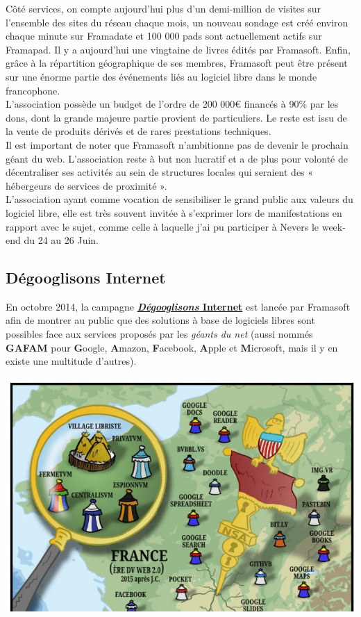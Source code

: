 \documentclass[10pt,a4paper, twoside]{report}
\begin{document}
	Côté services, on compte aujourd'hui plus d'un demi-million de visites sur l'ensemble des sites du réseau chaque mois, un nouveau sondage est créé environ chaque minute sur Framadate et 100 000 pads sont actuellement actifs sur Framapad. Il y a aujourd'hui une vingtaine de livres édités par Framasoft. Enfin, grâce à la répartition géographique de ses membres, Framasoft peut être présent sur une énorme partie des événements liés au logiciel libre dans le monde francophone.
	\\
	
	L'association possède un budget de l'ordre de 200 000\euro{} financés à 90\% par les dons, dont la grande majeure partie provient de particuliers. Le reste est issu de la vente de produits dérivés et de rares prestations techniques.
	\\
	
	Il est important de noter que Framasoft n'ambitionne pas de devenir le prochain géant du web. L'association reste à but non lucratif et a de plus pour volonté de décentraliser ses activités au sein de structures locales qui seraient des « hébergeurs de services de proximité ».
	\\
		
	L'association ayant comme vocation de sensibiliser le grand public aux valeurs du logiciel libre, elle est très souvent invitée à s'exprimer lors de manifestations en rapport avec le sujet, comme celle à laquelle j'ai pu participer à Nevers le week-end du 24 au 26 Juin.
	
	\subsection{Dégooglisons Internet}
	\label{subsec:degoogl}
	
	En octobre 2014, la campagne \href{https://degooglisons-internet.org/}{\textbf{\textit{Dégooglisons} Internet}} est lancée par Framasoft afin de montrer au public que des solutions à base de logiciels libres sont possibles face aux services proposés par les \textit{géants du net} (aussi nommés \textbf{GAFAM} pour \textbf{G}oogle, \textbf{A}mazon, \textbf{F}acebook, \textbf{A}pple et \textbf{M}icrosoft, mais il y en existe une multitude d'autres).
	

	\centerline{\includegraphics[width=1\textwidth]{images/degooglisons-internet.jpg}}
\end{document}
